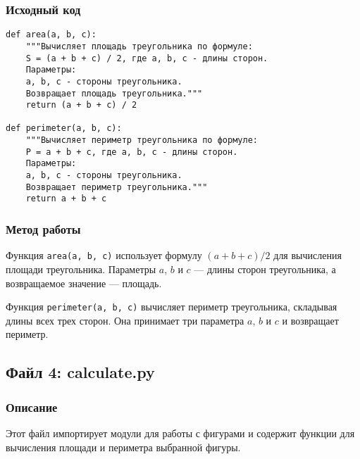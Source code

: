 \documentclass{article}
\begin{document}
\subsubsection{Исходный код}
\begin{verbatim}
def area(a, b, c):
    """Вычисляет площадь треугольника по формуле:
    S = (a + b + c) / 2, где a, b, c - длины сторон.
    Параметры:
    a, b, c - стороны треугольника.
    Возвращает площадь треугольника."""
    return (a + b + c) / 2

def perimeter(a, b, c):
    """Вычисляет периметр треугольника по формуле:
    P = a + b + c, где a, b, c - длины сторон.
    Параметры:
    a, b, c - стороны треугольника.
    Возвращает периметр треугольника."""
    return a + b + c
\end{verbatim}

\subsubsection{Метод работы}
Функция \texttt{area(a, b, c)} использует формулу \((a + b + c) / 2\) для вычисления площади треугольника. Параметры \( a \), \( b \) и \( c \) — длины сторон треугольника, а возвращаемое значение — площадь.

Функция \texttt{perimeter(a, b, c)} вычисляет периметр треугольника, складывая длины всех трех сторон. Она принимает три параметра \( a \), \( b \) и \( c \) и возвращает периметр.

\newpage

\subsection{Файл 4: calculate.py}
\subsubsection{Описание}
Этот файл импортирует модули для работы с фигурами и содержит функции для вычисления площади и периметра выбранной фигуры.
\end{document}
